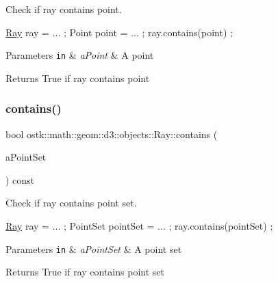 Check if ray contains point. 


\begin{DoxyCode}
\hyperlink{classostk_1_1math_1_1geom_1_1d3_1_1objects_1_1_ray_a78335698f8a4f72e613e607b13121df0}{Ray} ray = ... ;
Point point = ... ;
ray.contains(point) ;
\end{DoxyCode}



\begin{DoxyParams}[1]{Parameters}
\mbox{\tt in}  & {\em a\+Point} & A point \\
\hline
\end{DoxyParams}
\begin{DoxyReturn}{Returns}
True if ray contains point 
\end{DoxyReturn}
\mbox{\label{classostk_1_1math_1_1geom_1_1d3_1_1objects_1_1_ray_a4433e066d6de57630140527bc74442ec}} 
\subsubsection{\texorpdfstring{contains()}{contains()}\hspace{0.1cm}{\footnotesize\ttfamily [2/2]}}
{\footnotesize\ttfamily bool ostk\+::math\+::geom\+::d3\+::objects\+::\+Ray\+::contains (\begin{DoxyParamCaption}\item[{const \hyperlink{classostk_1_1math_1_1geom_1_1d3_1_1objects_1_1_point_set}{Point\+Set} \&}]{a\+Point\+Set }\end{DoxyParamCaption}) const}



Check if ray contains point set. 


\begin{DoxyCode}
\hyperlink{classostk_1_1math_1_1geom_1_1d3_1_1objects_1_1_ray_a78335698f8a4f72e613e607b13121df0}{Ray} ray = ... ;
PointSet pointSet = ... ;
ray.contains(pointSet) ;
\end{DoxyCode}



\begin{DoxyParams}[1]{Parameters}
\mbox{\tt in}  & {\em a\+Point\+Set} & A point set \\
\hline
\end{DoxyParams}
\begin{DoxyReturn}{Returns}
True if ray contains point set 
\end{DoxyReturn}
\mbox{\label{classostk_1_1math_1_1geom_1_1d3_1_1objects_1_1_ray_a986aa3d13740b411f72115503b1c9a72}} 
